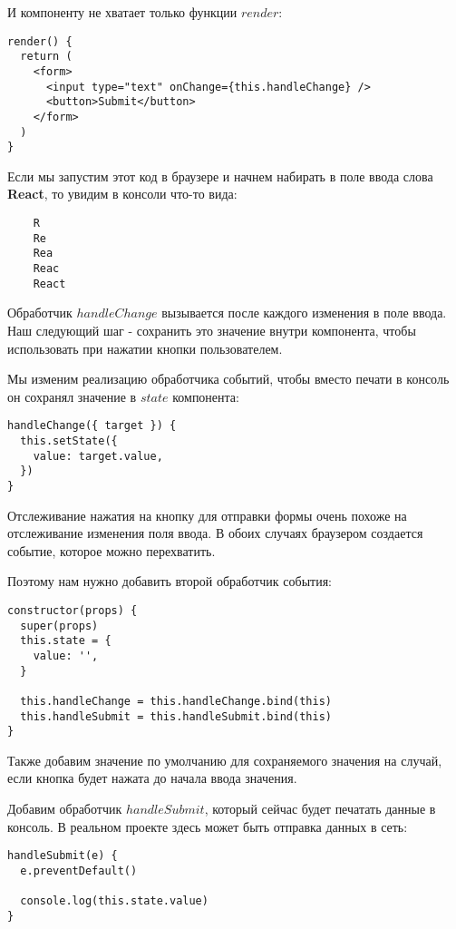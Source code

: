 И компоненту не хватает только функции $render$:

\begin{lstlisting}
render() {
  return (
    <form>
      <input type="text" onChange={this.handleChange} />
      <button>Submit</button>
    </form>
  ) 
}
\end{lstlisting}

Если мы запустим этот код в браузере и начнем набирать в поле ввода слова \textbf{React}, то увидим в консоли что-то вида:

\begin{lstlisting}
    R
    Re
    Rea
    Reac
    React
\end{lstlisting}

Обработчик $handleChange$ вызывается после каждого изменения в поле ввода. Наш следующий шаг - сохранить это значение внутри компонента, чтобы использовать при нажатии кнопки пользователем.

Мы изменим реализацию обработчика событий, чтобы вместо печати в консоль он сохранял значение в $state$ компонента:

\begin{lstlisting}
handleChange({ target }) {
  this.setState({
    value: target.value,
  })
}
\end{lstlisting}

Отслеживание нажатия на кнопку для отправки формы очень похоже на отслеживание изменения поля ввода. В обоих случаях браузером создается событие, которое можно перехватить.

Поэтому нам нужно добавить второй обработчик события:

\begin{lstlisting}
constructor(props) {
  super(props)
  this.state = {
    value: '',
  }
  
  this.handleChange = this.handleChange.bind(this)
  this.handleSubmit = this.handleSubmit.bind(this)
}
\end{lstlisting}

Также добавим значение по умолчанию для сохраняемого значения на случай, если кнопка будет нажата до начала ввода значения.

Добавим обработчик $handleSubmit$, который сейчас будет печатать данные в консоль. В реальном проекте здесь может быть отправка данных в сеть:

\begin{lstlisting}
handleSubmit(e) {
  e.preventDefault()
  
  console.log(this.state.value)
}
\end{lstlisting}

